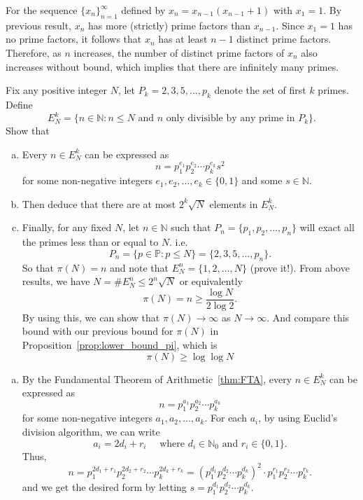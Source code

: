 \documentclass{elegantbook}
\begin{document}
\begin{problemset}[Exercises]
\begin{solution}
    For the sequence $\{x_n\}_{n=1}^{\infty}$ defined by $x_{n} = x_{n-1}(x_{n-1}+1)$ with $x_1 = 1$. By previous result, $x_n$ has more (strictly) prime factors than $x_{n-1}$. Since $x_1 = 1$ has no prime factors, it follows that $x_n$ has at least $n-1$ distinct prime factors. Therefore, as $n$ increases, the number of distinct prime factors of $x_n$ also increases without bound, which implies that there are infinitely many primes.
  \end{solution}  
  \item Fix any positive integer $N$, let $P_k={2, 3, 5, \ldots, p_k}$ denote the set of first $k$ primes. Define
  \[
    E^k_N = \{n \in \mathbb{N}: n\leq N \text{ and $n$ only divisible by any prime in } P_k\}.
  \]
  Show that
  \begin{enumerate}[(a)]
    \item Every $n \in E^k_N$ can be expressed as
    \[
      n = p_1^{e_1} p_2^{e_2} \cdots p_k^{e_k} s^2
    \]
    for some non-negative integers $e_1, e_2, \ldots, e_k \in \{0, 1\}$ and some $s \in \mathbb{N}$.
    \item Then deduce that there are at most $2^k \sqrt{N}$ elements in $E^k_N$.
    \item Finally, for any fixed $N$, let $n\in\mathbb{N}$ such that $P_n=\{p_1, p_2, \ldots, p_n\}$ will exact all the primes less than or equal to $N$. i.e.
    \[
      P_n = \{p \in \mathbb{P}: p \leq N\}= \{2, 3, 5, \ldots, p_n\}.
    \]
    So that $\pi(N)=n$ and note that $E^n_N=\{1, 2, \ldots, N\}$ (prove it!). From above results, we have $N=\#E^n_N \leq 2^n \sqrt{N}$ or equivalently
    \[
      \pi(N)=n \geq \frac{\log N}{2 \log 2}.
    \]
    By using this, we can show that $\pi(N)\to\infty$ as $N \to \infty$. And compare this bound with our previous bound for $\pi(N)$ in Proposition~\ref{prop:lower_bound_pi}, which is
    \[
      \pi(N) \geq \log \log N
    \]
  \end{enumerate}
  \begin{solution}
    \begin{enumerate}[(a)]
      \item By the Fundamental Theorem of Arithmetic~\ref{thm:FTA}, every $n \in E^k_N$ can be expressed as
      \[
        n = p_1^{a_1} p_2^{a_2} \cdots p_k^{a_k}
      \]
      for some non-negative integers $a_1, a_2, \ldots, a_k$. For each $a_i$, by using Euclid's division algorithm, we can write
      \[
        a_i = 2d_i + r_i \quad \text{ where } d_i \in \mathbb{N}_0 \text{ and } r_i \in \{0, 1\}.
      \]
      Thus,
      \[
        n = p_1^{2d_1 + r_1} p_2^{2d_2 + r_2} \cdots p_k^{2d_k + r_k} = (p_1^{d_1} p_2^{d_2} \cdots p_k^{d_k})^2 \cdot p_1^{r_1} p_2^{r_2} \cdots p_k^{r_k}.
      \]
      and we get the desired form by letting $s = p_1^{d_1} p_2^{d_2} \cdots p_k^{d_k}$.


\end{enumerate}
\end{solution}
\end{problemset}
\end{document}
